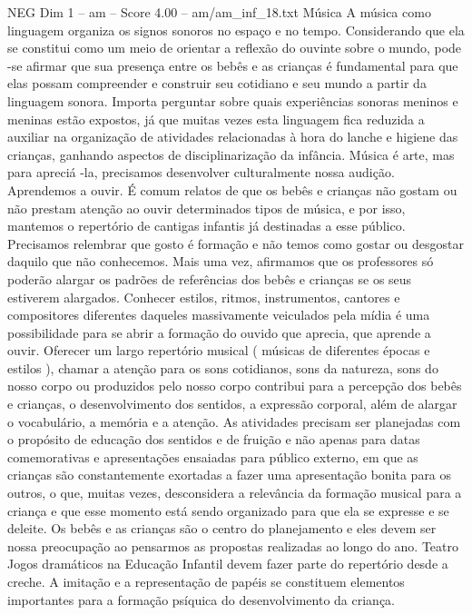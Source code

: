 \begin{textsample}{NEG Dim 1 – am – Score 4.00 – am/am\_inf\_18.txt}  \label{ex:f1_neg_068}
Música A música como linguagem organiza os signos sonoros no espaço e no tempo.
Considerando que ela se constitui como um meio de orientar a reflexão do ouvinte sobre o mundo, pode -se afirmar que sua presença entre os bebês e as crianças é fundamental para que elas possam compreender e construir seu cotidiano e seu mundo a partir da linguagem sonora.
Importa perguntar sobre quais experiências sonoras meninos e meninas estão expostos, já que muitas vezes esta linguagem fica reduzida a auxiliar na organização de atividades relacionadas à hora do lanche e higiene das crianças, ganhando aspectos de disciplinarização da infância.
Música é arte, mas para apreciá -la, precisamos desenvolver culturalmente nossa audição.
Aprendemos a ouvir.
É comum relatos de que os bebês e crianças não gostam ou não prestam atenção ao ouvir determinados tipos de música, e por isso, mantemos o repertório de cantigas infantis já destinadas a esse público.
Precisamos relembrar que gosto é formação e não temos como gostar ou desgostar daquilo que não conhecemos.
Mais uma vez, afirmamos que os professores só poderão alargar os padrões de referências dos bebês e crianças se os seus estiverem alargados.
Conhecer estilos, ritmos, instrumentos, cantores e compositores diferentes daqueles massivamente veiculados pela mídia é uma possibilidade para se abrir a formação do ouvido que aprecia, que aprende a ouvir.
Oferecer um largo repertório musical ( músicas de diferentes épocas e estilos ), chamar a atenção para os sons cotidianos, sons da natureza, sons do nosso corpo ou produzidos pelo nosso corpo contribui para a percepção dos bebês e crianças, o desenvolvimento dos sentidos, a expressão corporal, além de alargar o vocabulário, a memória e a atenção.
As atividades precisam ser planejadas com o propósito de educação dos sentidos e de fruição e não apenas para datas comemorativas e apresentações ensaiadas para público externo, em que as crianças são constantemente exortadas a fazer uma apresentação bonita para os outros, o que, muitas vezes, desconsidera a relevância da formação musical para a criança e que esse momento está sendo organizado para que ela se expresse e se deleite.
Os bebês e as crianças são o centro do planejamento e eles devem ser nossa preocupação ao pensarmos as propostas realizadas ao longo do ano.
Teatro Jogos dramáticos na Educação Infantil devem fazer parte do repertório desde a creche.
A imitação e a representação de papéis se constituem elementos importantes para a formação psíquica do desenvolvimento da criança.

\end{textsample}
